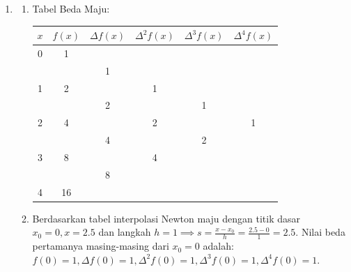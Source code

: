 \documentclass[11pt,letterpaper]{article}
\begin{document}
\begin{enumerate}
  \item \begin{enumerate}[label=\alph*.]
          \item Tabel Beda Maju:
                \begin{center}
                  \begin{tabular}{|c|c|c|c|c|c|}
                    \hline
                    $x$ & $f(x)$ & $\Delta f(x)$ & $\Delta^2 f(x)$ & $\Delta^3 f(x)$ & $\Delta^4 f(x)$ \\
                    \hline
                    0   & 1      &               &                 &                 &                 \\
                        &        & 1             &                 &                 &                 \\
                    1   & 2      &               & 1               &                 &                 \\
                        &        & 2             &                 & 1               &                 \\
                    2   & 4      &               & 2               &                 & 1               \\
                        &        & 4             &                 & 2               &                 \\
                    3   & 8      &               & 4               &                 &                 \\
                        &        & 8             &                 &                 &                 \\
                    4   & 16     &               &                 &                 &                 \\
                    \hline
                  \end{tabular}
                \end{center}
          \item Berdasarkan tabel interpolasi Newton maju dengan titik dasar $x_0 = 0, x=2.5$ dan langkah $h=1 \implies s = \frac{x-x_0}{h} = \frac{2.5-0}{1} = 2.5$.
                Nilai beda pertamanya masing-masing dari $x_0=0$ adalah:
                $f(0)=1, \Delta f(0)=1, \Delta^2 f(0)=1, \Delta^3 f(0)=1, \Delta^4 f(0)=1$.


\end{enumerate}
\end{enumerate}
\end{document}
